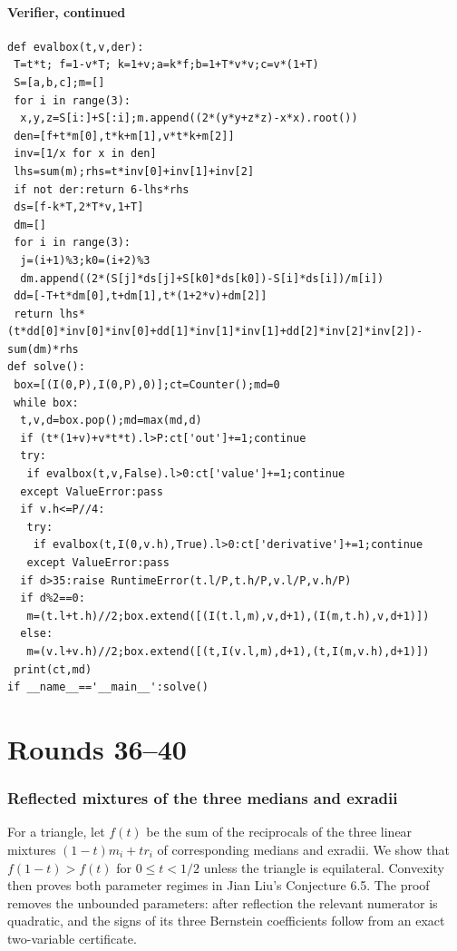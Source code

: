 \documentclass[11pt,a4paper]{article}
\numberwithin{equation}{section}
\theoremstyle{definition}
\theoremstyle{remark}
\newenvironment{sectionabstract}{\par\smallskip\begingroup\small\noindent}{\par\endgroup\medskip}
\begin{document}
\subsection*{Verifier, continued}
\footnotesize\begin{Verbatim}
def evalbox(t,v,der):
 T=t*t; f=1-v*T; k=1+v;a=k*f;b=1+T*v*v;c=v*(1+T)
 S=[a,b,c];m=[]
 for i in range(3):
  x,y,z=S[i:]+S[:i];m.append((2*(y*y+z*z)-x*x).root())
 den=[f+t*m[0],t*k+m[1],v*t*k+m[2]]
 inv=[1/x for x in den]
 lhs=sum(m);rhs=t*inv[0]+inv[1]+inv[2]
 if not der:return 6-lhs*rhs
 ds=[f-k*T,2*T*v,1+T]
 dm=[]
 for i in range(3):
  j=(i+1)%3;k0=(i+2)%3
  dm.append((2*(S[j]*ds[j]+S[k0]*ds[k0])-S[i]*ds[i])/m[i])
 dd=[-T+t*dm[0],t+dm[1],t*(1+2*v)+dm[2]]
 return lhs*(t*dd[0]*inv[0]*inv[0]+dd[1]*inv[1]*inv[1]+dd[2]*inv[2]*inv[2])-sum(dm)*rhs
def solve():
 box=[(I(0,P),I(0,P),0)];ct=Counter();md=0
 while box:
  t,v,d=box.pop();md=max(md,d)
  if (t*(1+v)+v*t*t).l>P:ct['out']+=1;continue
  try:
   if evalbox(t,v,False).l>0:ct['value']+=1;continue
  except ValueError:pass
  if v.h<=P//4:
   try:
    if evalbox(t,I(0,v.h),True).l>0:ct['derivative']+=1;continue
   except ValueError:pass
  if d>35:raise RuntimeError(t.l/P,t.h/P,v.l/P,v.h/P)
  if d%2==0:
   m=(t.l+t.h)//2;box.extend([(I(t.l,m),v,d+1),(I(m,t.h),v,d+1)])
  else:
   m=(v.l+v.h)//2;box.extend([(t,I(v.l,m),d+1),(t,I(m,v.h),d+1)])
 print(ct,md)
if __name__=='__main__':solve()
\end{Verbatim}


\par\endgroup
\clearpage
\part{Rounds 36--40}

\begingroup
\newcommand{\cyc}{\mathop{\sum_{\rm cyc}}}
\section{\texorpdfstring{Reflected mixtures of the three medians and exradii}{Reflected mixtures of the three medians and exradii}}\label{section:r36meiji}
\par\medskip


\begin{sectionabstract}
For a triangle, let $f(t)$ be the sum of the reciprocals of the three linear mixtures $(1-t)m_i+t r_i$ of corresponding medians and exradii. We show that $f(1-t)>f(t)$ for $0\le t<1/2$ unless the triangle is equilateral. Convexity then proves both parameter regimes in Jian Liu's Conjecture 6.5. The proof removes the unbounded parameters: after reflection the relevant numerator is quadratic, and the signs of its three Bernstein coefficients follow from an exact two-variable certificate.
\end{sectionabstract}
\end{document}
